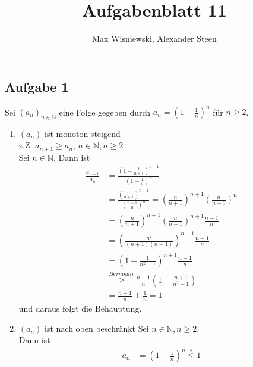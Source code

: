 \documentclass[11pt,a4paper,ngerman]{article}
\date{}
\title{Aufgabenblatt 11}
\author{Max Wisniewski, Alexander Steen}
\begin{document}

\renewcommand{\figurename}{Figur}

\maketitle
\thispagestyle{fancy}

\subsection*{Aufgabe 1}
Sei $\left( a_n \right)_{n \in \mathbb{N}}$ eine Folge gegeben durch $a_n = (1-\frac{1}{n})^n$ für $n \geq 2$. \\

\begin{enumerate}[(1)]
\item $\left( a_n \right)$ ist monoton steigend \\
z.Z. $a_{n+1} \geq a_n$, $n \in \mathbb{N}, n \geq 2$ \\
Sei $n \in \mathbb{N}$. Dann ist
\begin{equation*}\begin{split}
\frac{a_{n+1}}{a_n} &= \frac{(1-\frac{1}{n+1})^{n+1}}{(1-\frac{1}{n})^n} \\
  &= \frac{ (\frac{n}{n+1})^{n+1} }{(\frac{n-1}{n})^n } 
  = \left(\frac{n}{n+1}\right)^{n+1} \left(\frac{n}{n-1}\right)^n  \\
  &= \left(\frac{n}{n+1}\right)^{n+1} \left(\frac{n}{n-1}\right)^{n+1} \frac{n-1}{n} \\
  &= \left(\frac{n^2}{(n+1)(n-1)}\right)^{n+1} \frac{n-1}{n} \\
  &= \left(1+\frac{1}{n^2-1}\right)^{n+1} \frac{n-1}{n} \\
  &\stackrel{Bernoulli}{\geq} \frac{n-1}{n}  \left(1 + \frac{n+1}{n^2-1}\right) \\
  &= \frac{n-1}{n}  + \frac{1}{n} = 1
\end{split}\end{equation*}
und daraus folgt die Behauptung.

\item $\left( a_n \right)$ ist nach oben beschränkt
Sei $n \in \mathbb{N}, n \geq 2$. \\
Dann ist 
\begin{equation*}\begin{split}
a_n &= \left(1 - \frac{1}{n}\right)^n \stackrel{*}{\leq} 1
\end{split}\end{equation*}
\end{enumerate}
\end{document}
